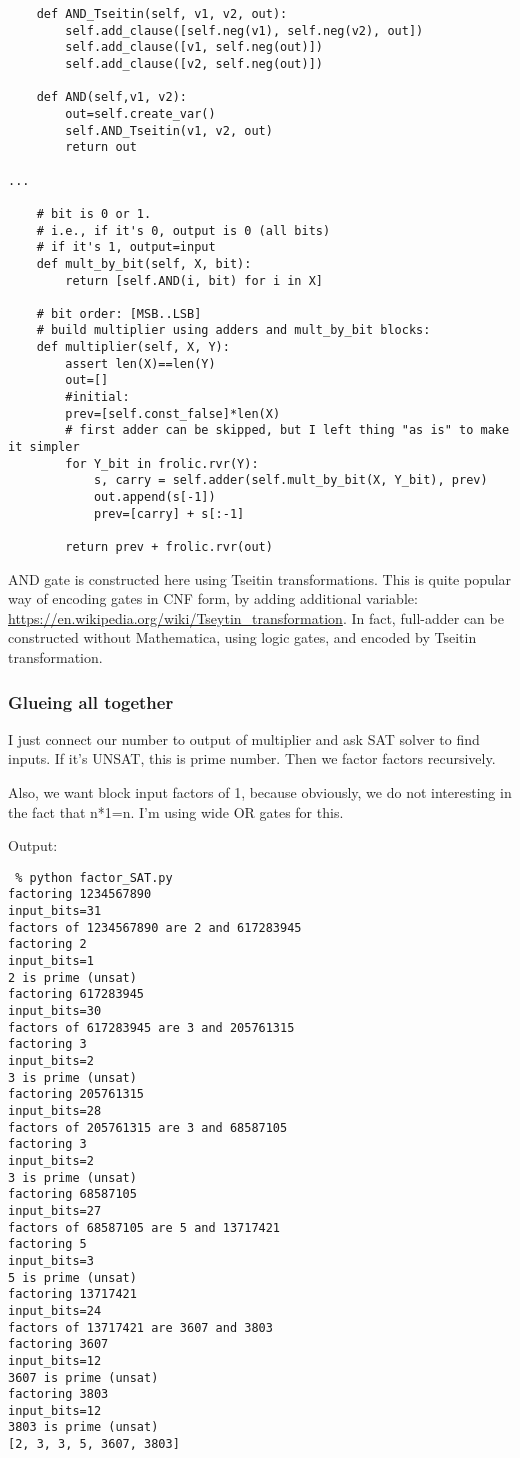 \begin{lstlisting}
    def AND_Tseitin(self, v1, v2, out):
        self.add_clause([self.neg(v1), self.neg(v2), out])
        self.add_clause([v1, self.neg(out)])
        self.add_clause([v2, self.neg(out)])
    
    def AND(self,v1, v2):
        out=self.create_var()
        self.AND_Tseitin(v1, v2, out)
        return out

...

    # bit is 0 or 1.
    # i.e., if it's 0, output is 0 (all bits)
    # if it's 1, output=input
    def mult_by_bit(self, X, bit):
        return [self.AND(i, bit) for i in X]

    # bit order: [MSB..LSB]
    # build multiplier using adders and mult_by_bit blocks:
    def multiplier(self, X, Y):
        assert len(X)==len(Y)
        out=[]
        #initial:
        prev=[self.const_false]*len(X)
        # first adder can be skipped, but I left thing "as is" to make it simpler
        for Y_bit in frolic.rvr(Y):
            s, carry = self.adder(self.mult_by_bit(X, Y_bit), prev)
            out.append(s[-1])
            prev=[carry] + s[:-1]
    
        return prev + frolic.rvr(out)
\end{lstlisting}

AND gate is constructed here using Tseitin transformations.
This is quite popular way of encoding gates in CNF form, by adding additional variable:
\url{https://en.wikipedia.org/wiki/Tseytin_transformation}.
In fact, full-adder can be constructed without Mathematica, using logic gates, and encoded by Tseitin transformation.

\subsubsection{Glueing all together}


I just connect our number to output of multiplier and ask SAT solver to find inputs.
If it's UNSAT, this is prime number.
Then we factor factors recursively.

Also, we want block input factors of 1, because obviously, we do not interesting in the fact that n*1=n.
I'm using wide OR gates for this.

Output:

\begin{lstlisting}
 % python factor_SAT.py
factoring 1234567890
input_bits=31
factors of 1234567890 are 2 and 617283945
factoring 2
input_bits=1
2 is prime (unsat)
factoring 617283945
input_bits=30
factors of 617283945 are 3 and 205761315
factoring 3
input_bits=2
3 is prime (unsat)
factoring 205761315
input_bits=28
factors of 205761315 are 3 and 68587105
factoring 3
input_bits=2
3 is prime (unsat)
factoring 68587105
input_bits=27
factors of 68587105 are 5 and 13717421
factoring 5
input_bits=3
5 is prime (unsat)
factoring 13717421
input_bits=24
factors of 13717421 are 3607 and 3803
factoring 3607
input_bits=12
3607 is prime (unsat)
factoring 3803
input_bits=12
3803 is prime (unsat)
[2, 3, 3, 5, 3607, 3803]
\end{lstlisting}

